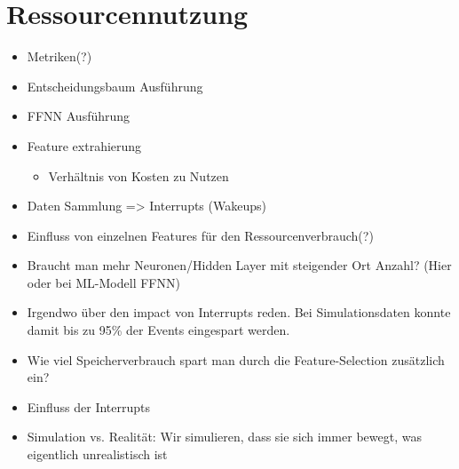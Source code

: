 \section{Ressourcennutzung}
\begin{itemize}
    \item Metriken(?)
    \item Entscheidungsbaum Ausführung
    \item FFNN Ausführung
    \item Feature extrahierung
    \begin{itemize}
        \item Verhältnis von Kosten zu Nutzen
    \end{itemize}
    \item Daten Sammlung => Interrupts (Wakeups)
    \item Einfluss von einzelnen Features für den Ressourcenverbrauch(?)
    \item Braucht man mehr Neuronen/Hidden Layer mit steigender Ort Anzahl? (Hier oder bei ML-Modell FFNN)
    \item Irgendwo über den impact von Interrupts reden. Bei Simulationsdaten konnte damit bis zu 95\% der Events eingespart werden.
    \item Wie viel Speicherverbrauch spart man durch die Feature-Selection zusätzlich ein?
    \item Einfluss der Interrupts
    \item Simulation vs. Realität: Wir simulieren, dass sie sich immer bewegt, was eigentlich unrealistisch ist
\end{itemize}